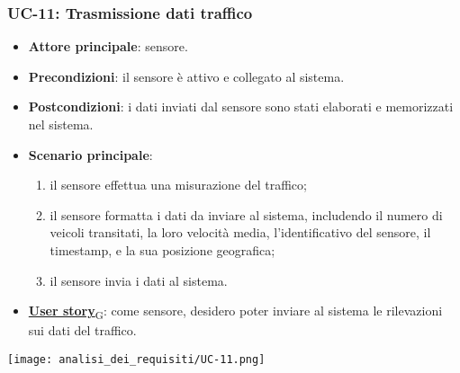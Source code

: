 \subsubsection{UC-11: Trasmissione dati traffico}
\begin{itemize}
	\item \textbf{Attore principale}: sensore.
	\item \textbf{Precondizioni}: il sensore è attivo e collegato al sistema.
	\item \textbf{Postcondizioni}: i dati inviati dal sensore sono stati elaborati e memorizzati nel sistema.
	\item \textbf{Scenario principale}:
	      \begin{enumerate}
		      \item il sensore effettua una misurazione del traffico;
		      \item il sensore formatta i dati da inviare al sistema, includendo il numero di veicoli transitati, la loro velocità media, l'identificativo del sensore,
		            il timestamp, e la sua posizione geografica;
		      \item il sensore invia i dati al sistema.
	      \end{enumerate}
	\item \href{https://7last.github.io/docs/pb/documentazione-interna/glossario\#user-story}{\textbf{User story}\textsubscript{G}}:
	      come sensore, desidero poter inviare al sistema le rilevazioni sui dati del traffico.
\end{itemize}

\begin{center}
	\texttt{[image: analisi\_dei\_requisiti/UC-11.png]}
\end{center}


